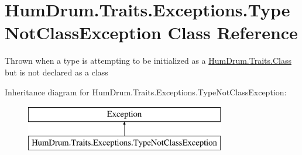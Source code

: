 \hypertarget{classHumDrum_1_1Traits_1_1Exceptions_1_1TypeNotClassException}{}\section{Hum\+Drum.\+Traits.\+Exceptions.\+Type\+Not\+Class\+Exception Class Reference}
\label{classHumDrum_1_1Traits_1_1Exceptions_1_1TypeNotClassException}


Thrown when a type is attempting to be initialized as a \hyperlink{classHumDrum_1_1Traits_1_1Class}{Hum\+Drum.\+Traits.\+Class} but is not declared as a class  


Inheritance diagram for Hum\+Drum.\+Traits.\+Exceptions.\+Type\+Not\+Class\+Exception\+:\begin{figure}[H]
\begin{center}
\leavevmode
\includegraphics[height=2.000000cm]{classHumDrum_1_1Traits_1_1Exceptions_1_1TypeNotClassException}
\end{center}
\end{figure}
